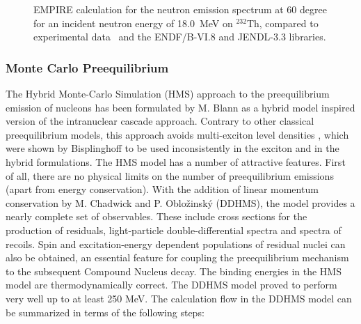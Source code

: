 \begin{figure}[htbp]
\caption{EMPIRE calculation for the neutron emission spectrum at 60 degree
for an incident neutron energy of 18.0~MeV on $^{232}$Th, compared to
experimental data~\protect\cite{mats} and the ENDF/B-VI.8 and JENDL-3.3
libraries.}
\label{thspectra18}
\end{figure}


\subsubsection{Monte Carlo Preequilibrium\label{DDHMS}}

The Hybrid Monte-Carlo Simulation (HMS) approach to the preequilibrium
emission of nucleons has been formulated by M. Blann \cite{Blann-HMS} as a
hybrid model \cite{hybrid,hybrid1,hybrid2,hybrid3} inspired version of the
intranuclear cascade approach. Contrary to other classical preequilibrium
models, this approach avoids multi-exciton level densities%
, which were shown by Bisplinghoff \cite%
{Bisplinghoff} to be used inconsistently in the exciton and in the hybrid
formulations. The HMS%
 model has a number of attractive features. First of all, there
are no physical limits on the number of preequilibrium emissions (apart from
energy conservation). With the addition of linear momentum conservation by
M. Chadwick and P. Oblo\v{z}insk\'{y}
(DDHMS), the model provides a nearly complete set of observables.
These include cross sections for the production of residuals, light-particle
double-differential spectra and spectra of recoils. Spin and
excitation-energy dependent populations of residual nuclei can also be
obtained, an essential feature for coupling the preequilibrium mechanism to
the subsequent Compound Nucleus decay. The binding energies in the HMS%
 model are thermodynamically correct. The DDHMS model proved to
perform very well
up to at least 250 MeV. %
The calculation flow in the DDHMS model can be summarized in terms of the
following steps:

